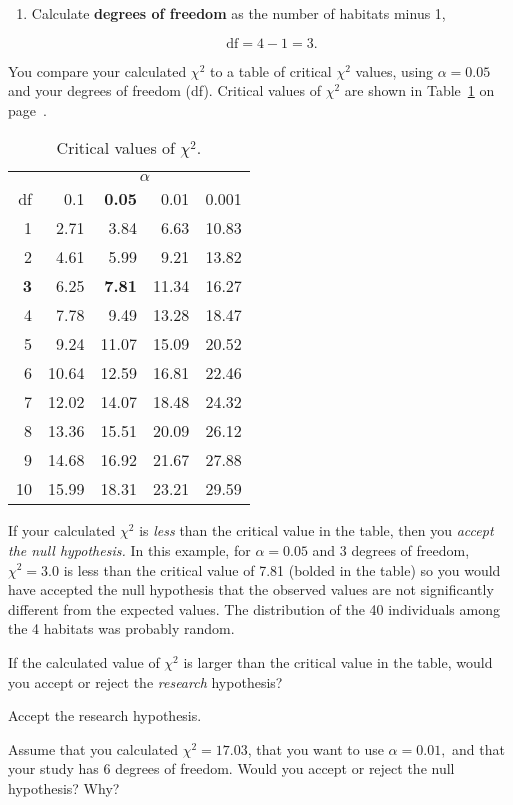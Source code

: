 \documentclass[12pt, hidelinks]{exam}
\newcommand*\AnswerBox[2]{%
    \parbox[t][#1]{0.92\textwidth}{%
    \begin{solution}#2\end{solution}}
    \vspace{\stretch{1}}
}
\newlength{\basespace}
\newcommand\chisq{$\chi^2$}
\begin{document}
\begin{questions}
\begin{enumerate}
	\item Calculate \textbf{degrees of freedom} as the number of habitats minus 1,
	
	\[ \mathrm{df} = 4 - 1 = 3.\]

\end{enumerate}

\setcounter{table}{0}
You compare your calculated \chisq{} to a table of critical \chisq{} values, using $\alpha=0.05$ and your degrees of freedom (df). Critical values of \chisq{} are shown in Table~\ref{tab:chi_table} on page~\pageref{tab:chi_table}.



{\setlength{\LTcapwidth}{2.2in}\liningnum
\begin{longtable}{@{}rrrrr@{}}
	\caption{Critical values of $\chi^2$.\label{tab:chi_table}} \tabularnewline
\toprule
 & \multicolumn{4}{c}{$\alpha$} \tabularnewline
 \cmidrule(l){2-5}
df & 0.1 & \textbf{0.05} & 0.01 & 0.001 \tabularnewline
\midrule
 1 &  2.71 &  3.84 &  6.63 & 10.83 \tabularnewline
 2 &  4.61 &  5.99 &  9.21 & 13.82 \tabularnewline
\textbf{3} &  6.25 &  \textbf{7.81} & 11.34 & 16.27 \tabularnewline
 4 &  7.78 &  9.49 & 13.28 & 18.47 \tabularnewline
 5 &  9.24 & 11.07 & 15.09 & 20.52 \tabularnewline
 6 & 10.64 & 12.59 & 16.81 & 22.46 \tabularnewline
 7 & 12.02 & 14.07 & 18.48 & 24.32 \tabularnewline
 8 & 13.36 & 15.51 & 20.09 & 26.12 \tabularnewline
 9 & 14.68 & 16.92 & 21.67 & 27.88 \tabularnewline
10 & 15.99 & 18.31 & 23.21 & 29.59 \tabularnewline
\bottomrule
\end{longtable}}


If your calculated \chisq{} is \emph{less} than the critical value in the table, then you \emph{accept the null hypothesis.} In this example, for $\alpha=0.05$ and 3 degrees of freedom, $\chi^2 = 3.0$ is less than the critical value of 7.81 (bolded in the table) so you would have accepted the null hypothesis that the observed values are not significantly different from the expected values. The distribution of the 40 individuals among the 4 habitats was probably random.
	
	\question
	If the calculated value of \chisq{} is larger than the critical value in the table, would you accept or reject the \emph{research} hypothesis?
	
	\AnswerBox{0.5\basespace}{Accept the research hypothesis.}
	
	\question
	Assume that you calculated $\chi^2 = 17.03$, that you want to use $\alpha = 0.01,$ and that your study has 6 degrees of freedom. Would you accept or reject the null hypothesis? Why?


\end{questions}
\end{document}
